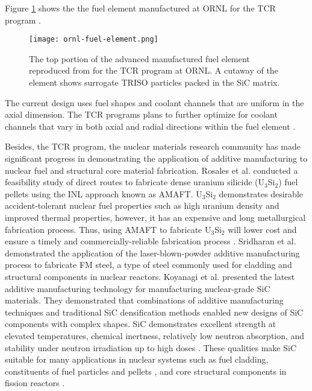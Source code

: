 Figure \ref{fig:ornl-fuel-element} shows the the fuel element manufactured at 
\gls{ORNL} for the \gls{TCR} program \cite{betzler_transformational_2020}. 
\begin{figure}[btp]
    \centering
    \texttt{[image: ornl-fuel-element.png]} 
    \caption{The top portion of the advanced manufactured fuel element 
    reproduced from \cite{betzler_transformational_2020} for the \acrfull{TCR} 
    program at \acrfull{ORNL}. A cutaway of the element shows surrogate TRISO 
    particles packed in the SiC matrix.}
    \label{fig:ornl-fuel-element}
\end{figure}
The current design uses fuel shapes and coolant channels that are uniform in the 
axial dimension. 
The \gls{TCR} programs plans to further optimize for coolant channels that vary 
in both axial and radial directions within the fuel element 
\cite{betzler_transformational_2020,sobes_artificial_2020}. 

Besides, the \gls{TCR} program, the nuclear materials research community has made 
significant progress in demonstrating the application of additive manufacturing 
to nuclear fuel and structural core material fabrication. 
Rosales et al. \cite{rosales_characterizing_2019} conducted a feasibility study 
of direct routes to fabricate dense uranium silicide (U$_3$Si$_2$) fuel pellets 
using the \gls{INL} approach known as \gls{AMAFT}. 
U$_3$Si$_2$ demonstrates desirable accident-tolerant nuclear fuel properties 
such as high uranium density and improved thermal properties, however, it has 
an expensive and long metallurgical fabrication process. 
Thus, using \gls{AMAFT} to fabricate U$_3$Si$_2$ will lower cost and ensure a
timely and commercially-reliable fabrication process \cite{rosales_characterizing_2019}. 
Sridharan et al. \cite{sridharan_performance_2019} demonstrated the application of
the laser-blown-powder additive manufacturing process to fabricate \gls{FM} steel, a type of 
steel commonly used for cladding and structural components in nuclear reactors. 
Koyanagi et al. \cite{koyanagi_additive_2020} presented the latest 
additive manufacturing technology for manufacturing nuclear-grade \gls{SiC} materials. 
They demonstrated that combinations of additive manufacturing techniques and 
traditional \gls{SiC} densification methods enabled new designs of \gls{SiC} 
components with complex shapes. 
\gls{SiC} demonstrates excellent strength at elevated temperatures, chemical inertness, 
relatively low neutron absorption, and stability under neutron irradiation up 
to high doses \cite{sauder_ceramic_2014, snead_handbook_2007,koyanagi_additive_2020}. 
These qualities make \gls{SiC} suitable for many applications in nuclear systems 
such as fuel cladding, constituents of fuel particles \cite{snead_handbook_2007} 
and pellets \cite{terrani_progress_2015}, and core structural components in fission 
reactors \cite{sauder_ceramic_2014}. 

